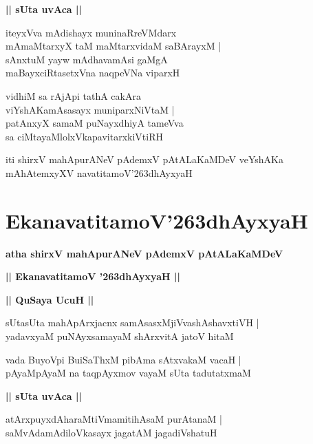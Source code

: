 \documentclass[twoside,12pt,openright]{book}
\def\S{\char'263}
\newcounter{shloka}[chapter]
\def\uvaca#1{\centerline{{\large\textbf{#1}}}}
\begin{document}
\uvaca{|| sUta uvAca ||}

\begin{shloka}%
iteyxVva mAdishayx muninaRreVMdarx\\
mAmaMtarxyX taM maMtarxvidaM saBArayxM |\\
sAnxtuM yayw mAdhavamAsi gaMgA \\
maBayxciRtasetxVna naqpeVNa viparxH 
\end{shloka}

\begin{shloka}%
vidhiM sa rAjApi tathA cakAra \\
viYshAKamAsasayx muniparxNiVtaM |\\
patAnxyX samaM puNayxdhiyA tameVva \\
sa ciMtayaMlolxVkapavitarxkiVtiRH 
\end{shloka}

\begin{center}
iti shirxV mahApurANeV pAdemxV pAtALaKaMDeV veYshAKa mAhAtemxyXV 
navatitamoV\S dhAyxyaH
\end{center}

\chapter{EkanavatitamoV\S dhAyxyaH}

\begin{center}
{\LARGE\bfseries atha shirxV mahApurANeV pAdemxV pAtALaKaMDeV }
\end{center}

\begin{center}         
{\LARGE\bfseries || EkanavatitamoV \S dhAyxyaH ||}
\end{center}

\uvaca{|| QuSaya UcuH ||}

\begin{shloka}%
sUtasUta mahApArxjacnx samAsasxMjiVvashAshavxtiVH |\\
yadavxyaM puNAyxsamayaM shArxvitA jatoV hitaM 
\end{shloka}

\begin{shloka}%
vada BuyoVpi BuiSaThxM pibAma sAtxvakaM vacaH |\\
pAyaMpAyaM na taqpAyxmov vayaM sUta tadutatxmaM 
\end{shloka}

\uvaca{|| sUta uvAca ||}

\begin{shloka}%
atArxpuyxdAharaMtiVmamitihAsaM purAtanaM |\\
saMvAdamAdiloVkasayx jagatAM jagadiVshatuH 
\end{shloka}
\end{document}
